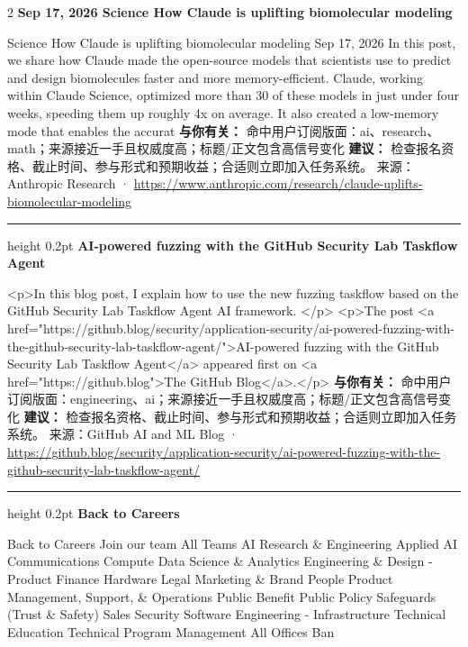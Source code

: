 \documentclass[10.5pt]{ctexart}
\begin{document}
\begin{multicols}{2}
{\large\bfseries Sep 17, 2026 Science How Claude is uplifting biomolecular modeling}\par
Science How Claude is uplifting biomolecular modeling Sep 17, 2026 In this post, we share how Claude made the open-source models that scientists use to predict and design biomolecules faster and more memory-efficient. Claude, working within Claude Science, optimized more than 30 of these models in just under four weeks, speeding them up roughly 4x on average. It also created a low-memory mode that enables the accurat
\textbf{与你有关：} 命中用户订阅版面：ai、research、math；来源接近一手且权威度高；标题/正文包含高信号变化
\textbf{建议：} 检查报名资格、截止时间、参与形式和预期收益；合适则立即加入任务系统。
{\footnotesize\color{ormuted} 来源：Anthropic Research · \url{https://www.anthropic.com/research/claude-uplifts-biomolecular-modeling}}
\vspace{2mm}
\hrule height 0.2pt
\vspace{2mm}
{\large\bfseries AI-powered fuzzing with the GitHub Security Lab Taskflow Agent}\par
<p>In this blog post, I explain how to use the new fuzzing taskflow based on the GitHub Security Lab Taskflow Agent AI framework. </p> <p>The post <a href="https://github.blog/security/application-security/ai-powered-fuzzing-with-the-github-security-lab-taskflow-agent/">AI-powered fuzzing with the GitHub Security Lab Taskflow Agent</a> appeared first on <a href="https://github.blog">The GitHub Blog</a>.</p>
\textbf{与你有关：} 命中用户订阅版面：engineering、ai；来源接近一手且权威度高；标题/正文包含高信号变化
\textbf{建议：} 检查报名资格、截止时间、参与形式和预期收益；合适则立即加入任务系统。
{\footnotesize\color{ormuted} 来源：GitHub AI and ML Blog · \url{https://github.blog/security/application-security/ai-powered-fuzzing-with-the-github-security-lab-taskflow-agent/}}
\vspace{2mm}
\hrule height 0.2pt
\vspace{2mm}
{\large\bfseries Back to Careers}\par
Back to Careers Join our team All Teams AI Research \& Engineering Applied AI Communications Compute Data Science \& Analytics Engineering \& Design - Product Finance Hardware Legal Marketing \& Brand People Product Management, Support, \& Operations Public Benefit Public Policy Safeguards (Trust \& Safety) Sales Security Software Engineering - Infrastructure Technical Education Technical Program Management All Offices Ban

\end{multicols}
\end{document}
